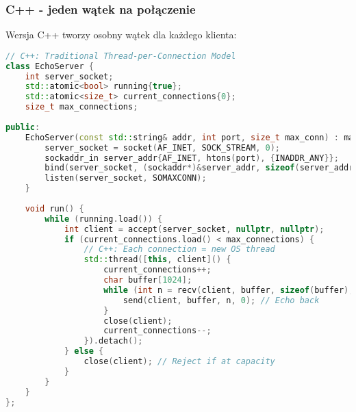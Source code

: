 \subsubsection{C++ - jeden wątek na połączenie}
Wersja C++ tworzy osobny wątek dla każdego klienta:
\begin{lstlisting}[language=C++, style=VS2017,  caption={Echo Serwer w C++ z jednym wątkiem na połączenie}, label={lst:cpp_echo_server}]
// C++: Traditional Thread-per-Connection Model
class EchoServer {
    int server_socket;
    std::atomic<bool> running{true};
    std::atomic<size_t> current_connections{0};
    size_t max_connections;
    
public:
    EchoServer(const std::string& addr, int port, size_t max_conn) : max_connections(max_conn) {
        server_socket = socket(AF_INET, SOCK_STREAM, 0);
        sockaddr_in server_addr{AF_INET, htons(port), {INADDR_ANY}};
        bind(server_socket, (sockaddr*)&server_addr, sizeof(server_addr));
        listen(server_socket, SOMAXCONN);
    }
    
    void run() {
        while (running.load()) {
            int client = accept(server_socket, nullptr, nullptr);
            if (current_connections.load() < max_connections) {
                // C++: Each connection = new OS thread
                std::thread([this, client]() {
                    current_connections++;
                    char buffer[1024];
                    while (int n = recv(client, buffer, sizeof(buffer), 0)) {
                        send(client, buffer, n, 0); // Echo back
                    }
                    close(client);
                    current_connections--;
                }).detach();
            } else {
                close(client); // Reject if at capacity
            }
        }
    }
};
\end{lstlisting}

